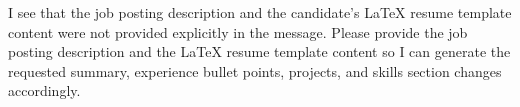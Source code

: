I see that the job posting description and the candidate's LaTeX resume template content were not provided explicitly in the message. Please provide the job posting description and the LaTeX resume template content so I can generate the requested summary, experience bullet points, projects, and skills section changes accordingly.